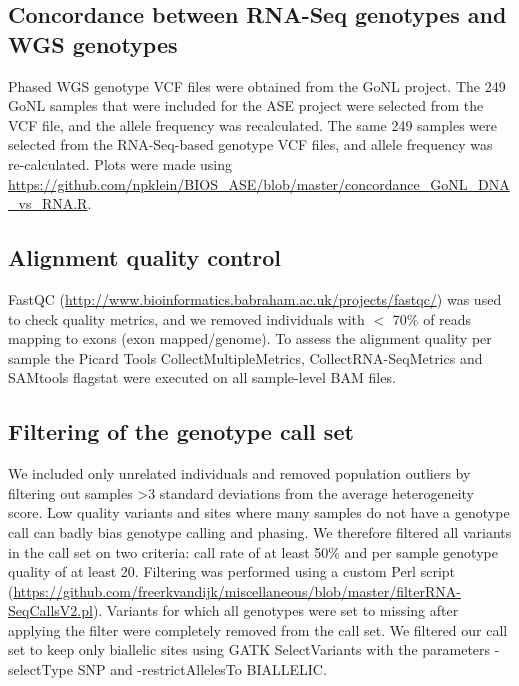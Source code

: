 {{\subsection{Concordance between RNA-Seq genotypes and WGS genotypes}
Phased WGS genotype VCF files were obtained from the GoNL project\cite{francioliWholegenomeSequenceVariation2014}. The 249 GoNL samples that were included for the ASE project were selected from the VCF file, and the allele frequency was recalculated. The same 249 samples were selected from the RNA-Seq-based genotype VCF files, and allele frequency was re-calculated. Plots were made using \url{https://github.com/npklein/BIOS\_ASE/blob/master/concordance\_GoNL\_DNA\_vs\_RNA.R}. 

\subsection{Alignment quality control}
FastQC (\url{http://www.bioinformatics.babraham.ac.uk/projects/fastqc/}) was used to check quality metrics, and we removed individuals with $<$ 70\% of reads mapping to exons (exon mapped/genome). To assess the alignment quality per sample the Picard Tools CollectMultipleMetrics, CollectRNA-SeqMetrics and SAMtools flagstat were executed on all sample-level BAM files.

\subsection{Filtering of the genotype call set}
We included only unrelated individuals and removed population outliers by filtering out samples >3 standard deviations from the average heterogeneity score. Low quality variants and sites where many samples do not have a genotype call can badly bias genotype calling and phasing. We therefore filtered all variants in the call set on two criteria: call rate of at least 50\% and per sample genotype quality of at least 20. Filtering was performed using a custom Perl script (\url{https://github.com/freerkvandijk/miscellaneous/blob/master/filterRNA-SeqCallsV2.pl}). Variants for which all genotypes were set to missing after applying the filter were completely removed from the call set. We filtered our call set to keep only biallelic sites using GATK SelectVariants with the parameters -selectType SNP and -restrictAllelesTo BIALLELIC.

}}
